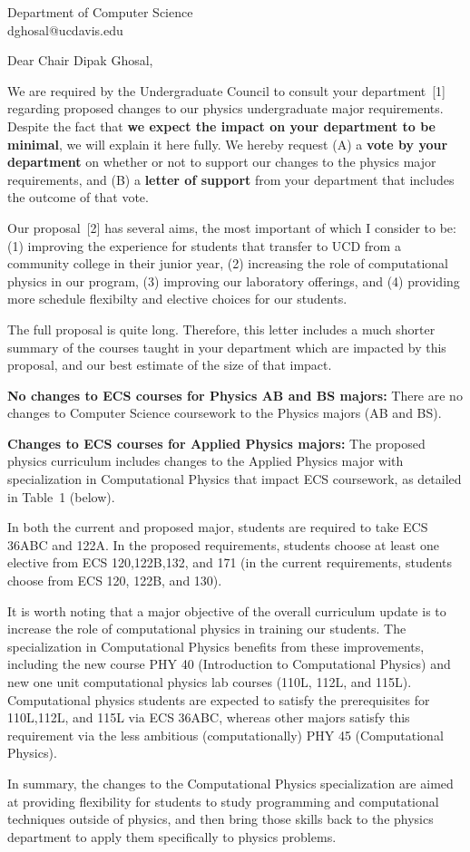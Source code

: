 \documentclass[letterpaper,12pt]{letter}
\def\letterparta{
We are required by the Undergraduate Council to consult your
department~[1] regarding proposed changes to our physics undergraduate
major requirements.  Despite the fact that {\bf we expect the
  impact on your department to be minimal}, we will explain it here
fully.  We hereby request (A) a {\bf vote by your department} on
whether or not to support our changes to the physics major
requirements, and (B) a {\bf letter of support} from your department
that includes the outcome of that vote.

Our proposal~[2] has several aims, the most important of which I
consider to be: (1) improving the experience for students that
transfer to UCD from a community college in their junior year, (2)
increasing the role of computational physics in our program, (3)
improving our laboratory offerings, and (4) providing more schedule
flexibilty and elective choices for our students.

The full proposal is quite long.  Therefore, this letter includes a
much shorter summary of the courses taught in your department which
are impacted by this proposal, and our best estimate of the size of
that impact.
}
\begin{document}
\begin{letter}{Department of Computer Science  \\ dghosal@ucdavis.edu}
\opening{Dear Chair Dipak Ghosal,}

\letterparta


{\bf No changes to ECS courses for Physics AB and BS majors:} There are no changes to Computer Science coursework to the Physics
majors (AB and BS).

{\bf Changes to ECS courses for Applied Physics majors:} The proposed physics curriculum includes changes to the Applied
Physics major with specialization in Computational Physics that impact
ECS coursework, as detailed in Table~1 (below).

In both the current and proposed major, students are required to take
ECS 36ABC and 122A.  In the proposed requirements, students choose at
least one elective from ECS 120,122B,132, and 171 (in the current
requirements, students choose from ECS 120, 122B, and 130).

It is worth noting that a major objective of the overall curriculum
update is to increase the role of computational physics in training
our students.  The specialization in Computational Physics benefits
from these improvements, including the new course PHY 40 (Introduction
to Computational Physics) and new one unit computational physics lab
courses (110L, 112L, and 115L).  Computational physics students are
expected to satisfy the prerequisites for 110L,112L, and 115L via ECS
36ABC, whereas other majors satisfy this requirement via the less
ambitious (computationally) PHY 45 (Computational Physics).

In summary, the changes to the Computational Physics specialization
are aimed at providing flexibility for students to study programming
and computational techniques outside of physics, and then bring those
skills back to the physics department to apply them specifically to
physics problems.


\end{letter}
\end{document}
